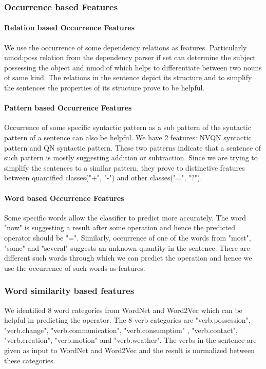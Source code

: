\documentclass[11pt]{article}
\begin{document}
\subsubsection{Occurrence based Features}
\paragraph{Relation based Occurrence Features}
We use the occurrence of some dependency relations as features. Particularly nmod:poss relation from the dependency parser if set can determine the subject possessing the object and nmod:of which helps to differentiate between two nouns of same kind. The relations in the sentence depict its structure and to simplify the sentences the properties of its structure prove to be helpful.
\paragraph{Pattern based Occurrence Features}
Occurrence of some specific syntactic pattern as a sub pattern of the syntactic pattern of a sentence can also be helpful. We have 2 features: NVQN syntactic pattern and QN syntactic pattern. These two patterns indicate that a sentence of such pattern is mostly suggesting addition or subtraction. Since we are trying to simplify the sentences to a similar pattern, they prove to distinctive features between quantified classes("+", "-") and other classes("=", "?"). 

\paragraph{Word based Occurrence Features}
Some specific words allow the classifier to predict more accurately. The word "now" is suggesting a result after some operation and hence the predicted operator should be "=". Similarly, occurrence of one of the words from "most", "some" and "several" suggests an unknown quantity in the sentence. There are different such words through which we can predict the operation and hence we use the occurrence of such words as features.

\subsubsection{Word similarity based features}
We identified 8 word categories from WordNet and Word2Vec which can be helpful in predicting the operator. The 8 verb categories are "verb.possession", "verb.change", "verb.communication", "verb.consumption" , "verb.contact", "verb.creation", "verb.motion" and "verb.weather". The verbs in the sentence are given as input to WordNet and Word2Vec and the result is normalized between these categories.
\end{document}
